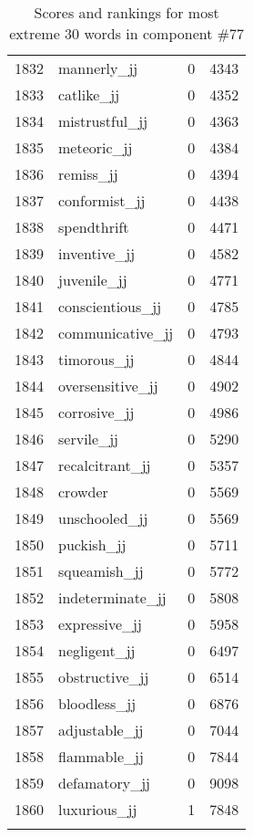 \begin{longtable}[!htbp]{| rlr@{.}l |}
    1832 & mannerly\_jj & 0 & 4343 \\
    1833 & catlike\_jj & 0 & 4352 \\
    1834 & mistrustful\_jj & 0 & 4363 \\
    1835 & meteoric\_jj & 0 & 4384 \\
    1836 & remiss\_jj & 0 & 4394 \\
    1837 & conformist\_jj & 0 & 4438 \\
    1838 & spendthrift & 0 & 4471 \\
    1839 & inventive\_jj & 0 & 4582 \\
    1840 & juvenile\_jj & 0 & 4771 \\
    1841 & conscientious\_jj & 0 & 4785 \\
    1842 & communicative\_jj & 0 & 4793 \\
    1843 & timorous\_jj & 0 & 4844 \\
    1844 & oversensitive\_jj & 0 & 4902 \\
    1845 & corrosive\_jj & 0 & 4986 \\
    1846 & servile\_jj & 0 & 5290 \\
    1847 & recalcitrant\_jj & 0 & 5357 \\
    1848 & crowder & 0 & 5569 \\
    1849 & unschooled\_jj & 0 & 5569 \\
    1850 & puckish\_jj & 0 & 5711 \\
    1851 & squeamish\_jj & 0 & 5772 \\
    1852 & indeterminate\_jj & 0 & 5808 \\
    1853 & expressive\_jj & 0 & 5958 \\
    1854 & negligent\_jj & 0 & 6497 \\
    1855 & obstructive\_jj & 0 & 6514 \\
    1856 & bloodless\_jj & 0 & 6876 \\
    1857 & adjustable\_jj & 0 & 7044 \\
    1858 & flammable\_jj & 0 & 7844 \\
    1859 & defamatory\_jj & 0 & 9098 \\
    1860 & luxurious\_jj & 1 & 7848 \\
    \hline
    \caption{Scores and rankings for most extreme 30 words in component \#77} \\
\end{longtable}
